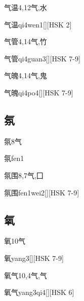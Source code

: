 \begin{Entry}{气温}{4,12}{⽓,⽔}
  \begin{Phonetics}{气温}{qi4wen1}[][HSK 2]
  \end{Phonetics}
\end{Entry}

\begin{Entry}{气管}{4,14}{⽓,⽵}
  \begin{Phonetics}{气管}{qi4guan3}[][HSK 7-9]
  \end{Phonetics}
\end{Entry}

\begin{Entry}{气魄}{4,14}{⽓,⿁}
  \begin{Phonetics}{气魄}{qi4po4}[][HSK 7-9]
  \end{Phonetics}
\end{Entry}

\subsection*{氛}

\begin{Entry}{氛}{8}{⽓}
  \begin{Phonetics}{氛}{fen1}
  \end{Phonetics}
\end{Entry}

\begin{Entry}{氛围}{8,7}{⽓,⼞}
  \begin{Phonetics}{氛围}{fen1wei2}[][HSK 7-9]
  \end{Phonetics}
\end{Entry}

\subsection*{氧}

\begin{Entry}{氧}{10}{⽓}
  \begin{Phonetics}{氧}{yang3}[][HSK 7-9]
  \end{Phonetics}
\end{Entry}

\begin{Entry}{氧气}{10,4}{⽓,⽓}
  \begin{Phonetics}{氧气}{yang3qi4}[][HSK 6]
  \end{Phonetics}
\end{Entry}


